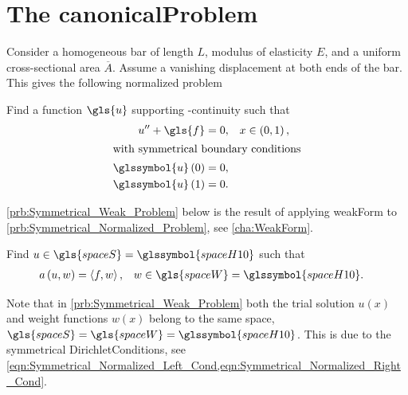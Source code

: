 \section[The Canonical Problem]{The \Gls{canonicalProblem}}
Consider a homogeneous bar of length $L$, modulus of elasticity $E$, and a uniform cross-sectional area $\overline{A}$.
Assume a vanishing displacement at both ends of the bar. This gives the following normalized problem 
\begin{problem}	\label{prb:Symmetrical_Normalized_Problem} 
	Find a function $\gls{u}$ supporting -continuity such that
	\begin{subequations} \label{eqn:Symmetrical_Normalized_Problem}
		\begin{align}
			u^{ \prime \prime } + \gls{f} &= 0, && x \in \left( 0, 1 \right), \label{eqn:Symmetrical_Normalized_Diff_Eq}	\\
		\intertext{with symmetrical boundary conditions}
			\glssymbol{u} \left( 0 \right) &= 0,  \label{eqn:Symmetrical_Normalized_Left_Cond}  \\
			\glssymbol{u} \left( 1 \right) &= 0.  \label{eqn:Symmetrical_Normalized_Right_Cond}
		\end{align}
	\end{subequations}
\end{problem}
%
\cref{prb:Symmetrical_Weak_Problem} below is the result of applying \gls{weakForm} to \cref{prb:Symmetrical_Normalized_Problem}, see \cref{cha:WeakForm}.
\begin{problem}	\label{prb:Symmetrical_Weak_Problem}
	Find $u \in \gls{spaceS} = \glssymbol{spaceH10}$ such that
	\begin{align}
		a \left( u, w \right) &= \left\langle f, w \right\rangle, && w \in \gls{spaceW} = \glssymbol{spaceH10}.
	\end{align}
\end{problem}
%
\begin{remark}
	Note that in \cref{prb:Symmetrical_Weak_Problem} both the trial solution $u \left( x \right)$ and weight functions $w \left( x \right)$ belong to
	the same space, $\gls{spaceS} = \gls{spaceW} = \glssymbol{spaceH10}$. This is due to the symmetrical \glspl{DirichletCondition}, see
	\cref{eqn:Symmetrical_Normalized_Left_Cond,eqn:Symmetrical_Normalized_Right_Cond}.
\end{remark}
%
